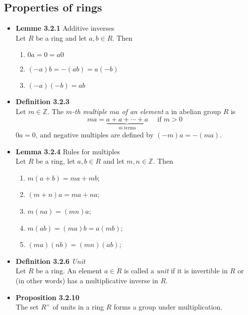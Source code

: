 \documentclass[11pt,a4paper]{article}
\begin{document}
\subsection{Properties of rings}

\begin{itemize}

    \item \textbf{Lemme 3.2.1} Additive inverses \\
        Let $R$ be a ring and let $a, b \in R$.
        Then
        \begin{enumerate}
            \item $0a = 0 = a0$
            \item $(-a)b = -(ab) = a(-b)$
            \item $(-a)(-b) = ab$
        \end{enumerate}

    \item \textbf{Definition 3.2.3} \\
        Let $m \in \mathbb{Z}$.
        The \emph{$m$-th multiple $ma$ of an element} a in abelian group $R$ is
        \[
            ma = \underbrace{a + a + \cdots + a}_{m \ \text{terms}} \quad \text{ if } m > 0
        \]
        $0a = 0$, and negative multiples are defined by $(-m)a = -(ma)$.

    \item \textbf{Lemma 3.2.4} Rules for multiples \\
        Let $R$ be a ring, let $a,b \in R$ and let $m,n \in \mathbb{Z}$.
        Then
        \begin{enumerate}
            \item $m(a+b)   = ma + mb$;
            \item $(m+n)a   = ma + na$;
            \item $m(na)    = (mn)a$;
            \item $m(ab)    = (ma)b      = a(mb)$;
            \item $(ma)(nb) = (mn)(ab)$;
        \end{enumerate}

    \item \textbf{Definition 3.2.6} \emph{Unit} \\
        Let $R$ be a ring.
        An element $a \in R$ is called a \emph{unit} if it is invertible in $R$ or (in other
        words) has a multiplicative inverse in $R$.

    \item \textbf{Proposition 3.2.10} \\
        The set $R^\times$ of units in a ring $R$ forms a group under multiplication.


\end{itemize}
\end{document}
